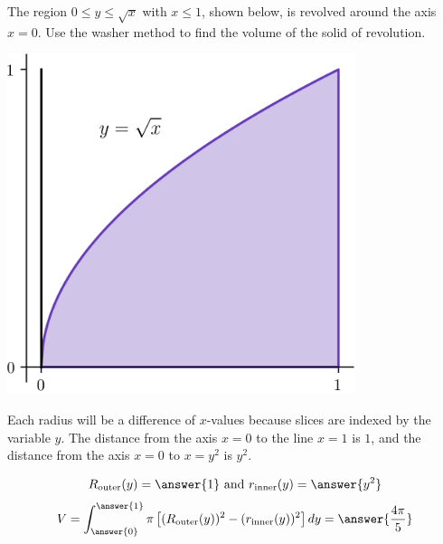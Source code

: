 \documentclass{ximera}
\begin{document}
\begin{exercise}
The region $0 \leq y \leq \sqrt{x}$ with $x \leq 1$, shown below, is revolved around the axis $x=0$. Use the washer method to find the volume of the solid of revolution.
\begin{center}
\begin{image}
\includegraphics[width=4in]{diskwasher/disk04.png}
\end{image}
\end{center}
\begin{hint}
Each radius will be a difference of $x$-values because slices are indexed by the variable $y$.
The distance from the axis $x=0$ to the line $x=1$ is $1$, and the distance from the axis $x=0$ to $x = y^2$ is $y^2$.
\end{hint}
\begin{prompt}
\[ R_{\mathrm{outer}} (y) = \answer{1} \text{ and } r_{\mathrm{inner}}(y) = \answer{y^2} \]
\[ V = \int_{\answer{0}}^{\answer{1}} \pi  \left[ (R_{\mathrm{outer}}(y))^2 - (r_{\mathrm{inner}}(y))^2 \right] dy =  \answer{\frac{4\pi}{5}} \]
\end{prompt}

\end{exercise}
\end{document}
